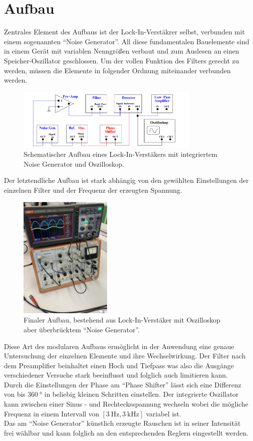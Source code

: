 \section{Aufbau}
Zentrales Element des Aufbaus ist der Lock-In-Verstäkrer selbst, verbunden mit einem sogenannten \enquote{Noise Generator}.
All diese fundamentalen Bauelemente sind in einem Gerät mit variablen Nenngrößen verbaut und zum Auslesen an einen Speicher-Oszillator geschlossen.
Um der vollen Funktion des Filters gerecht zu werden, müssen die Elemente in folgender Ordnung miteinander verbunden werden.
\begin{figure}
    \centering
    \includegraphics[width=0.8\textwidth]{bilder/plan.png}
    \caption{Schematischer Aufbau eines Lock-In-Verstäkers mit integriertem Noise Generator und Oszilloskop. \cite{skript}} 
    \label{fig:plan}
\end{figure}
Der letztendliche Aufbau ist stark abhängig von den gewählten Einstellungen der einzelnen Filter und der Frequenz der erzeugten Spannung.
\begin{figure}
    \centering
    \includegraphics[width=0.4\textwidth]{bilder/RL.png}
    \caption{Finaler Aufbau, bestehend aus Lock-In-Verstäker mit Oszilloskop aber überbrücktem \enquote{Noise Generator}.} 
    \label{fig:RL}
\end{figure}
Diese Art des modularen Aufbaus ermöglicht in der Anwendung eine genaue Untersuchung der einzelnen Elemente und ihre Wechselwirkung.
Der Filter nach dem Preamplifier beinhaltet einen Hoch und Tiefpass was also die Ausgänge verschiedener Versuche stark beeinflusst und folglich auch limitieren kann.
\\
Durch die Einstellungen der Phase am \enquote{Phase Shifter} lässt sich eine Differenz von bis $\SI{360}{\degree}$ in beliebig kleinen Schritten einstellen.
Der integrierte Oszillator kann zwischen einer Sinus - und Rechtecksspannung wechseln wobei die mögliche Frequenz in einem Intervall von $[\SI{3}{\hertz}, \SI{3}{\kilo\hertz}]$ variabel ist.
\\
Das am \enquote{Noise Generator} künstlich erzeugte Rauschen ist in seiner Intensität frei wählbar und kann folglich an den entsprechenden Reglern eingestellt werden.


